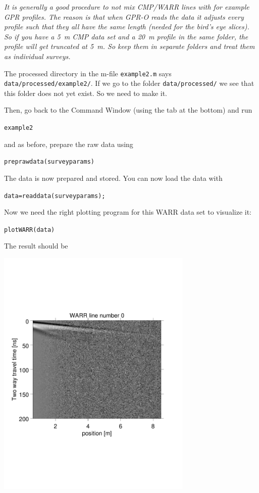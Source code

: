 \documentclass[11pt]{article}
\begin{document}
\emph{It is generally a good procedure to not mix CMP/WARR lines with
  for example GPR profiles. The reason is that when GPR-O reads the
  data it adjusts every profile such that they all have the same
  length (needed for the bird's eye slices). So if you have a \SI{5}{m} CMP
  data set and a \SI{20}{m} profile in the same folder, the profile will get
  truncated at \SI{5}{m}. So keep them in separate folders and treat them as
  individual surveys.}

The processed directory in the m-file \verb#example2.m# says
\verb#data/processed/example2/#. If we go to the folder
\verb#data/processed/# we see that this folder does not yet exist. So we
need to make it.

Then, go back to the Command Window (using the tab at the bottom) and
run

\qquad \verb#example2#

and as before, prepare the raw data using

\qquad \verb#preprawdata(surveyparams)#

The data is now prepared and stored. You can now load the data with

\qquad \verb#data=readdata(surveyparams);#

Now we need the right plotting program for this WARR data set to
visualize it:

\qquad \verb#plotWARR(data)#
 

The result should be
\begin{center}
\includegraphics[width=0.7\textwidth, trim = 0.9cm 6cm 2cm
  6.5cm,clip]{figures/WARR}
\end{center}
 
\end{document}
